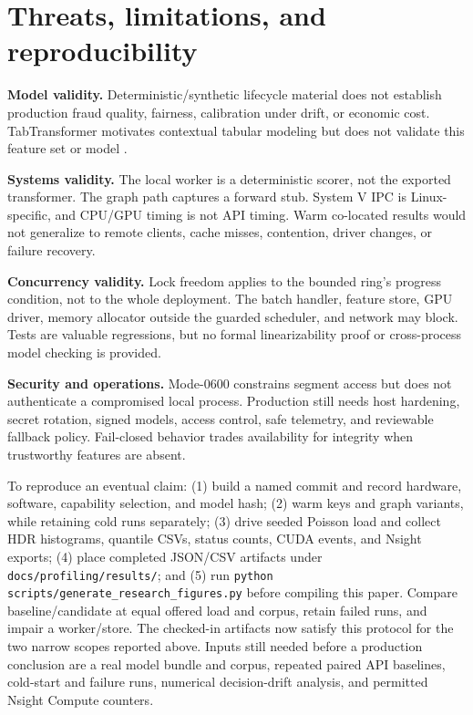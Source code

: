 \documentclass[10pt,a4paper,twocolumn]{article}
\newcommand{\code}[1]{\texttt{#1}}
\begin{document}
\section{Threats, limitations, and reproducibility}
\textbf{Model validity.} Deterministic/synthetic lifecycle material does not
establish production fraud quality, fairness, calibration under drift, or
economic cost. TabTransformer motivates contextual tabular modeling but does not
validate this feature set or model \cite{tabtransformer}.

\textbf{Systems validity.} The local worker is a deterministic scorer, not the
exported transformer. The graph path captures a forward stub. System V IPC is
Linux-specific, and CPU/GPU timing is not API timing. Warm co-located results
would not generalize to remote clients, cache misses, contention, driver changes,
or failure recovery.

\textbf{Concurrency validity.} Lock freedom applies to the bounded ring's
progress condition, not to the whole deployment. The batch handler, feature
store, GPU driver, memory allocator outside the guarded scheduler, and network
may block. Tests are valuable regressions, but no formal linearizability proof
or cross-process model checking is provided.

\textbf{Security and operations.} Mode-0600 constrains segment access but does
not authenticate a compromised local process. Production still needs host
hardening, secret rotation, signed models, access control, safe telemetry, and
reviewable fallback policy. Fail-closed behavior trades availability for
integrity when trustworthy features are absent.

To reproduce an eventual claim: (1) build a named commit and record hardware,
software, capability selection, and model hash; (2) warm keys and graph variants,
while retaining cold runs separately; (3) drive seeded Poisson load and collect
HDR histograms, quantile CSVs, status counts, CUDA events, and Nsight exports;
(4) place completed JSON/CSV artifacts under \code{docs/profiling/results/};
and (5) run \code{python scripts/generate\_research\_figures.py} before compiling
this paper. Compare baseline/candidate at equal offered load and corpus, retain
failed runs, and impair a worker/store. The checked-in artifacts now satisfy
this protocol for the two narrow scopes reported above. Inputs still needed
before a production conclusion are a real model bundle and corpus, repeated
paired API baselines, cold-start and failure runs, numerical decision-drift
analysis, and permitted Nsight Compute counters.
\end{document}
